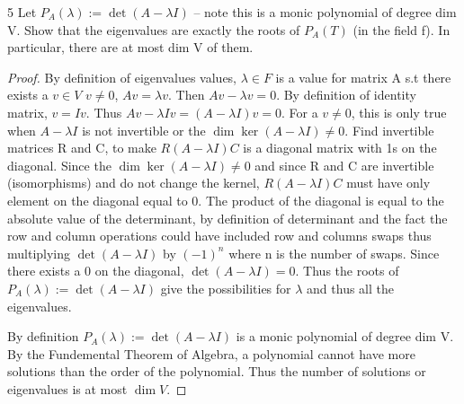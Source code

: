 \documentclass{article}
\begin{document}
\begin{PROB}{5}\label{Problem 5.}
    Let $P_A(\lambda) := \det(A - \lambda I)$  -- note this is a monic polynomial of degree dim V. Show that the eigenvalues are exactly the roots of $P_A(T)$ (in the field f). In particular, there are at most dim V of them.
\end{PROB}
\begin{proof}
    By definition of eigenvalues values, $\lambda \in F$ is a value for matrix A s.t there exists a $v \in V$ $v \neq 0$, $Av = \lambda v$. Then $Av - \lambda v =0$. By definition of identity matrix, $v = Iv$. Thus $Av - \lambda Iv = (A - \lambda I)v = 0$. For a $v \neq 0$, this is only true when $A - \lambda I$ is not invertible or the $\dim \ker(A - \lambda I)\neq 0$. Find invertible matrices R and C, to make $R(A - \lambda I)C$ is a diagonal matrix with 1s on the diagonal. Since the $\dim \ker(A - \lambda I)\neq 0$ and since R and C are invertible (isomorphisms) and do not change the kernel, $R(A - \lambda I)C$ must have only element on the diagonal equal to 0. The product of the diagonal is equal to the absolute value of the determinant, by definition of determinant and the fact the row and column operations could have included row and columns swaps thus multiplying $\det(A - \lambda I)$ by $(-1)^n$ where n is the number of swaps. Since there exists a 0 on the diagonal, $\det(A - \lambda I) = 0$. Thus the roots of $P_A(\lambda) := \det(A - \lambda I)$ give the possibilities for $\lambda$ and thus all the eigenvalues.

    By definition $P_A(\lambda) := \det(A - \lambda I)$ is a monic polynomial of degree dim V. By the Fundemental Theorem of Algebra, a polynomial cannot have more solutions than the order of the polynomial. Thus the number of solutions or eigenvalues is at most $\dim V$.
\end{proof}

\bigskip
\end{document}
